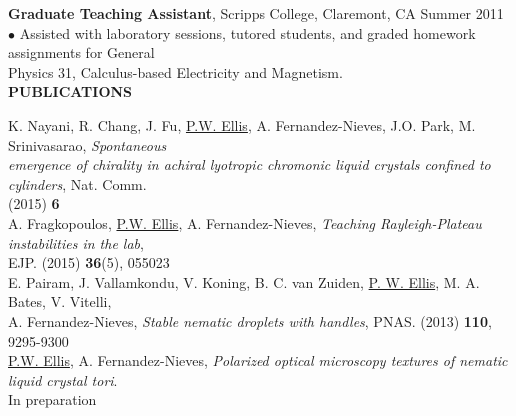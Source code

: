 \documentclass[10pt]{article}
\newenvironment{changemargin}[2]{%
  \list{}{\rightmargin#2\leftmargin#1
    \parsep=0pt\topsep=1pt\partopsep=0pt}
\item[]} {\endlist}
\newenvironment{indentmore}{\begin{changemargin}{10pt}{0cm}}{\end{changemargin}}
\begin{document}
{\bf  Graduate Teaching Assistant}, Scripps College, Claremont, CA \hfill Summer 2011\\
\hspace*{10pt}$\bullet$ Assisted with laboratory sessions, tutored students, and graded homework assignments for General\\ \hspace*{15pt} Physics 31, Calculus-based Electricity and Magnetism. \\

\textbf{\large PUBLICATIONS} 
\begin{indentmore}
K. Nayani, R. Chang, J. Fu, \underline{P.W. Ellis}, A. Fernandez-Nieves, J.O. Park, M. Srinivasarao, \emph{Spontaneous \\ \hspace*{15pt} emergence of chirality in achiral lyotropic chromonic liquid crystals confined to cylinders}, Nat. Comm. \\ \hspace*{15pt}  (2015) {\bf 6} \\

A. Fragkopoulos, \underline{P.W. Ellis}, A. Fernandez-Nieves, \emph{Teaching Rayleigh-Plateau instabilities in the lab}, \\ \hspace*{15pt}EJP. (2015) {\bf 36}(5), 055023 \\

E. Pairam, J. Vallamkondu, V. Koning, B. C. van Zuiden, \underline{P. W. Ellis}, M. A. Bates, V. Vitelli, \\ \hspace*{15pt}A. Fernandez-Nieves, \emph{Stable nematic droplets with handles}, PNAS. (2013) {\bf 110}, 9295-9300\\

\underline{P.W. Ellis}, A. Fernandez-Nieves, \emph{Polarized optical microscopy textures of nematic liquid crystal tori}. \\ \hspace*{15pt}In preparation\\
\end{indentmore}
\end{document}
